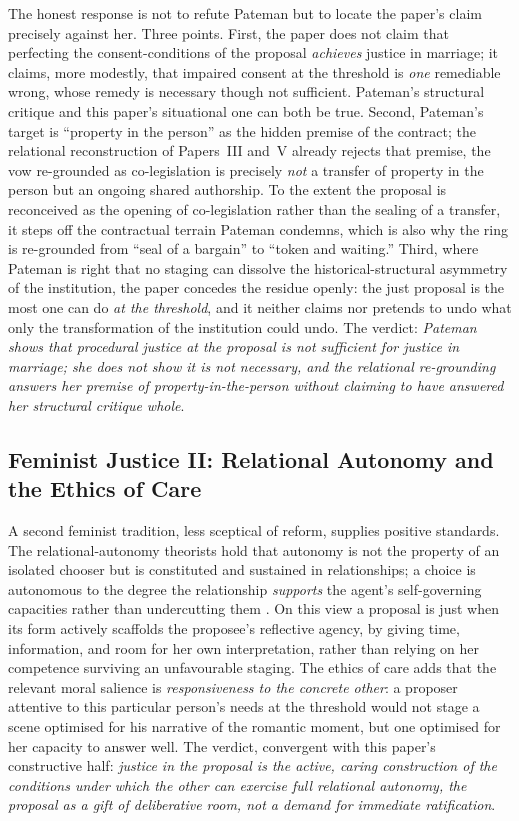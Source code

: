 The honest response is not to refute Pateman but to locate the paper's claim precisely against her. Three points. First, the paper does not claim that perfecting the consent-conditions of the proposal \emph{achieves} justice in marriage; it claims, more modestly, that impaired consent at the threshold is \emph{one} remediable wrong, whose remedy is necessary though not sufficient. Pateman's structural critique and this paper's situational one can both be true. Second, Pateman's target is ``property in the person'' as the hidden premise of the contract; the relational reconstruction of Papers~III and~V already rejects that premise, the vow re-grounded as co-legislation is precisely \emph{not} a transfer of property in the person but an ongoing shared authorship. To the extent the proposal is reconceived as the opening of co-legislation rather than the sealing of a transfer, it steps off the contractual terrain Pateman condemns, which is also why the ring is re-grounded from ``seal of a bargain'' to ``token and waiting.'' Third, where Pateman is right that no staging can dissolve the historical-structural asymmetry of the institution, the paper concedes the residue openly: the just proposal is the most one can do \emph{at the threshold}, and it neither claims nor pretends to undo what only the transformation of the institution could undo. The verdict: \emph{Pateman shows that procedural justice at the proposal is not sufficient for justice in marriage; she does not show it is not necessary, and the relational re-grounding answers her premise of property-in-the-person without claiming to have answered her structural critique whole}.

\subsection{Feminist Justice II: Relational Autonomy and the Ethics of Care}

A second feminist tradition, less sceptical of reform, supplies positive standards. The relational-autonomy theorists hold that autonomy is not the property of an isolated chooser but is constituted and sustained in relationships; a choice is autonomous to the degree the relationship \emph{supports} the agent's self-governing capacities rather than undercutting them \parencite{mackenzie2000relational}. On this view a proposal is just when its form actively scaffolds the proposee's reflective agency, by giving time, information, and room for her own interpretation, rather than relying on her competence surviving an unfavourable staging. The ethics of care adds that the relevant moral salience is \emph{responsiveness to the concrete other}: a proposer attentive to this particular person's needs at the threshold would not stage a scene optimised for his narrative of the romantic moment, but one optimised for her capacity to answer well. The verdict, convergent with this paper's constructive half: \emph{justice in the proposal is the active, caring construction of the conditions under which the other can exercise full relational autonomy, the proposal as a gift of deliberative room, not a demand for immediate ratification}.

